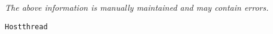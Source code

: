\label{pkg:hostthread}

{\tiny \it The above information is manually maintained and may contain errors.}
\begin{verbatim}
Hostthread
\end{verbatim}
